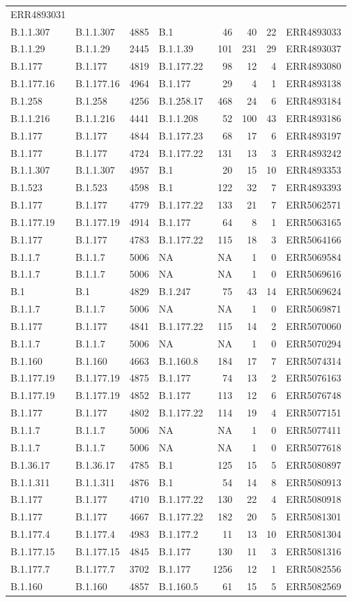 \documentclass[
]{article}
\begin{document}
\begin{longtable}[]{@{}llrlrrrl@{}}
ERR4893031\tabularnewline
B.1.1.307 & B.1.1.307 & 4885 & B.1 & 46 & 40 & 22 &
ERR4893033\tabularnewline
B.1.1.29 & B.1.1.29 & 2445 & B.1.1.39 & 101 & 231 & 29 &
ERR4893037\tabularnewline
B.1.177 & B.1.177 & 4819 & B.1.177.22 & 98 & 12 & 4 &
ERR4893080\tabularnewline
B.1.177.16 & B.1.177.16 & 4964 & B.1.177 & 29 & 4 & 1 &
ERR4893138\tabularnewline
B.1.258 & B.1.258 & 4256 & B.1.258.17 & 468 & 24 & 6 &
ERR4893184\tabularnewline
B.1.1.216 & B.1.1.216 & 4441 & B.1.1.208 & 52 & 100 & 43 &
ERR4893186\tabularnewline
B.1.177 & B.1.177 & 4844 & B.1.177.23 & 68 & 17 & 6 &
ERR4893197\tabularnewline
B.1.177 & B.1.177 & 4724 & B.1.177.22 & 131 & 13 & 3 &
ERR4893242\tabularnewline
B.1.1.307 & B.1.1.307 & 4957 & B.1 & 20 & 15 & 10 &
ERR4893353\tabularnewline
B.1.523 & B.1.523 & 4598 & B.1 & 122 & 32 & 7 &
ERR4893393\tabularnewline
B.1.177 & B.1.177 & 4779 & B.1.177.22 & 133 & 21 & 7 &
ERR5062571\tabularnewline
B.1.177.19 & B.1.177.19 & 4914 & B.1.177 & 64 & 8 & 1 &
ERR5063165\tabularnewline
B.1.177 & B.1.177 & 4783 & B.1.177.22 & 115 & 18 & 3 &
ERR5064166\tabularnewline
B.1.1.7 & B.1.1.7 & 5006 & NA & NA & 1 & 0 & ERR5069584\tabularnewline
B.1.1.7 & B.1.1.7 & 5006 & NA & NA & 1 & 0 & ERR5069616\tabularnewline
B.1 & B.1 & 4829 & B.1.247 & 75 & 43 & 14 & ERR5069624\tabularnewline
B.1.1.7 & B.1.1.7 & 5006 & NA & NA & 1 & 0 & ERR5069871\tabularnewline
B.1.177 & B.1.177 & 4841 & B.1.177.22 & 115 & 14 & 2 &
ERR5070060\tabularnewline
B.1.1.7 & B.1.1.7 & 5006 & NA & NA & 1 & 0 & ERR5070294\tabularnewline
B.1.160 & B.1.160 & 4663 & B.1.160.8 & 184 & 17 & 7 &
ERR5074314\tabularnewline
B.1.177.19 & B.1.177.19 & 4875 & B.1.177 & 74 & 13 & 2 &
ERR5076163\tabularnewline
B.1.177.19 & B.1.177.19 & 4852 & B.1.177 & 113 & 12 & 6 &
ERR5076748\tabularnewline
B.1.177 & B.1.177 & 4802 & B.1.177.22 & 114 & 19 & 4 &
ERR5077151\tabularnewline
B.1.1.7 & B.1.1.7 & 5006 & NA & NA & 1 & 0 & ERR5077411\tabularnewline
B.1.1.7 & B.1.1.7 & 5006 & NA & NA & 1 & 0 & ERR5077618\tabularnewline
B.1.36.17 & B.1.36.17 & 4785 & B.1 & 125 & 15 & 5 &
ERR5080897\tabularnewline
B.1.1.311 & B.1.1.311 & 4876 & B.1 & 54 & 14 & 8 &
ERR5080913\tabularnewline
B.1.177 & B.1.177 & 4710 & B.1.177.22 & 130 & 22 & 4 &
ERR5080918\tabularnewline
B.1.177 & B.1.177 & 4667 & B.1.177.22 & 182 & 20 & 5 &
ERR5081301\tabularnewline
B.1.177.4 & B.1.177.4 & 4983 & B.1.177.2 & 11 & 13 & 10 &
ERR5081304\tabularnewline
B.1.177.15 & B.1.177.15 & 4845 & B.1.177 & 130 & 11 & 3 &
ERR5081316\tabularnewline
B.1.177.7 & B.1.177.7 & 3702 & B.1.177 & 1256 & 12 & 1 &
ERR5082556\tabularnewline
B.1.160 & B.1.160 & 4857 & B.1.160.5 & 61 & 15 & 5 &
ERR5082569\tabularnewline

\end{longtable}
\end{document}
